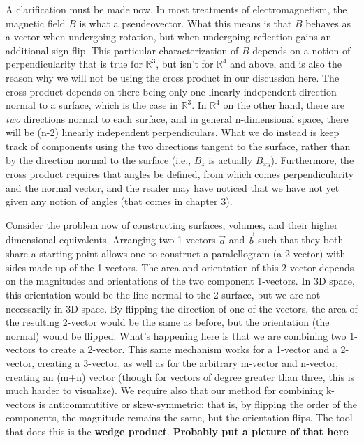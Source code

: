 \documentclass{book}
\begin{document}
A clarification must be made now. In most treatments of electromagnetism, the magnetic field $B$ is what a pseudeovector. What this means is that $B$ behaves as a vector when undergoing rotation, but when undergoing reflection gains an additional sign flip. This particular characterization of $B$ depends on a notion of perpendicularity that is true for $\mathbb{R}^3$, but isn't for $\mathbb{R}^4$ and above, and is also the reason why we will not be using the cross product in our discussion here. The cross product depends on there being only one linearly independent direction normal to a surface, which is the case in $\mathbb{R}^3$. In $\mathbb{R}^4$ on the other hand, there are \emph{two} directions normal to each surface, and in general n-dimensional space, there will be (n-2) linearly independent perpendiculars. What we do instead is keep track of components using the two directions tangent to the surface, rather than by the direction normal to the surface (i.e., $B_z$ is actually $B_{xy}$). Furthermore, the cross product requires that angles be defined, from which comes perpendicularity and the normal vector, and the reader may have noticed that we have not yet given any notion of angles (that comes in chapter 3). 



Consider the problem now of constructing surfaces, volumes, and their higher dimensional equivalents. Arranging two 1-vectors $\vec{a}$ and $\vec{b}$ such that they both share a starting point allows one to construct a paralellogram (a 2-vector) with sides made up of the 1-vectors. The area and orientation of this 2-vector depends on the magnitudes and orientations of the two component 1-vectors. In 3D space, this orientation would be the line normal to the 2-surface, but we are not necessarily in 3D space. By flipping the direction of one of the vectors, the area of the resulting 2-vector would be the same as before, but the orientation (the normal) would be flipped. What's happening here is that we are combining two 1-vectors to create a 2-vector. This same mechanism works for a 1-vector and a 2-vector, creating a 3-vector, as well as for the arbitrary m-vector and n-vector, creating an (m+n) vector (though for vectors of degree greater than three, this is much harder to visualize). We require also that our method for combining k-vectors is anticommutitive or skew-symmetric; that is, by flipping the order of the components, the magnitude remains the same, but the orientation flips. The tool that does this is the \textbf{wedge product}.
\textbf{Probably put a picture of that here}
\end{document}
